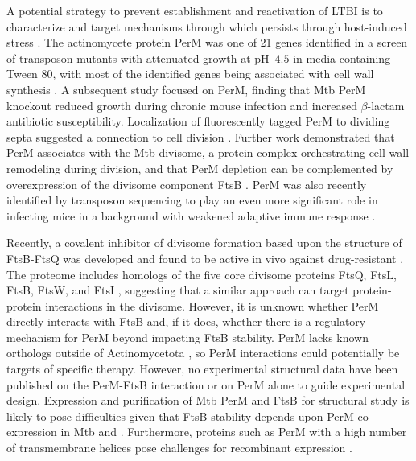 \documentclass[pdflatex,sn-basic]{sn-jnl}%
\begin{document}
A potential strategy to prevent establishment and reactivation of LTBI is to characterize and target mechanisms through which \mtb{} persists through host-induced stress \citep{dartoisAntituberculosisTreatmentStrategies2022}. The actinomycete protein PerM was one of 21 genes identified in a screen of transposon \mtb{} mutants with attenuated growth at pH~$4.5$ in media containing Tween 80, with most of the identified genes being associated with cell wall synthesis \citep{vandalMembraneProteinPreserves2008}. A subsequent study focused on PerM, finding that Mtb PerM knockout reduced growth during chronic mouse infection and increased $\beta$-lactam antibiotic susceptibility. Localization of fluorescently tagged PerM to dividing septa suggested a connection to cell division \citep{goodsmithDisruptionTuberculosisMembrane2015}. Further work demonstrated that PerM associates with the Mtb divisome, a protein complex orchestrating cell wall remodeling during division, and that PerM depletion can be complemented by overexpression of the divisome component FtsB \citep{wangPersistentMycobacteriumTuberculosis2019}. PerM was also recently identified by transposon sequencing to play an even more significant role in infecting mice in a background with weakened adaptive immune response \citep{meadeGenomewideScreenIdentifies2023}.

Recently, a covalent inhibitor of divisome formation based upon the structure of FtsB-FtsQ was developed and found to be active in vivo against drug-resistant \ec{} \citep{paulussenCovalentProteomimeticInhibitor2022}. The \mtb{} proteome includes homologs of the five core \ec{} divisome proteins FtsQ, FtsL, FtsB, FtsW, and FtsI \citep{wuCharacterizationConservedNovel2018}, suggesting that a similar approach can target protein-protein interactions in the \mtb{} divisome. However, it is unknown whether PerM directly interacts with FtsB  \citep{wangPersistentMycobacteriumTuberculosis2019} and, if it does, whether there is a regulatory mechanism for PerM beyond impacting FtsB stability. PerM lacks known orthologs outside of Actinomycetota \citep{goodsmithDisruptionTuberculosisMembrane2015}, so PerM interactions could potentially be targets of specific therapy. However, no experimental structural data have been published on the PerM-FtsB interaction or on PerM alone to guide experimental design. Expression and purification of Mtb PerM and FtsB for structural study is likely to pose difficulties given that FtsB stability depends upon PerM co-expression in Mtb and \msmegfull{} \citep{wangPersistentMycobacteriumTuberculosis2019}. Furthermore, proteins such as PerM with a high number of transmembrane helices pose challenges for recombinant expression \citep{graveHighthroughputStrategyIdentification2022, korepanovaCloningExpressionMultiple2005}.
\end{document}
